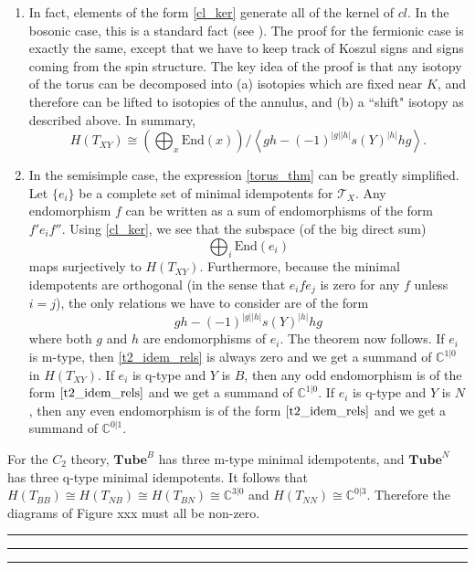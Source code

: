 \documentclass[12pt,a4paper]{article}
\newcommand{\cc}{\mathbb{C}}
\newcommand{\mct}{\mathcal{T}}
\newcommand\be            {\begin{equation}}
\newcommand\ee            {\end{equation}}
\newcommand{\End}{\text{End}}
\newcommand{\tube}{\textbf{Tube}}
\newcommand{\kwsep}{\bigskip\hrule\medskip\hrule\medskip\hrule\bigskip}
\begin{document}
\begin{enumerate}
\item In fact, elements of the form \eqref{cl_ker} generate all of the kernel of $cl$.
In the bosonic case, this is a standard fact (see \cite{Walker2006}).
The proof for the fermionic case is exactly the same, except that we have to keep track of
Koszul signs and signs coming from the spin structure.
The key idea of the proof is that any isotopy of the torus can be decomposed into (a) isotopies which
are fixed near $K$, and therefore can be lifted to isotopies of the annulus, and (b) a ``shift" isotopy
as described above.
In summary,
\be \label{torus_thm}
	H(T_{XY}) \cong \left( \bigoplus_x \End(x) \right) / \left\langle gh - (-1)^{|g| |h|} s(Y)^{|h|} hg \right\rangle .
\ee

\item In the semisimple case, the expression \eqref{torus_thm} can be greatly simplified.
Let $\{e_i\}$ be a complete set of minimal idempotents for $\mct_X$.
Any endomorphism $f$ can be written as a sum of endomorphisms of the form $f' e_i f''$.
Using \eqref{cl_ker}, we see that the subspace (of the big direct sum)
\be
	\bigoplus_i \End(e_i)
\ee
maps surjectively to $H(T_{XY})$.
Furthermore, because the minimal idempotents are orthogonal (in the sense that $e_i f e_j$ is zero for any $f$ unless $i=j$),
the only relations we have to consider are of the form
\be \label{t2_idem_rels}
	gh - (-1)^{|g| |h|} s(Y)^{|h|} hg
\ee
where both $g$ and $h$ are endomorphisms of $e_i$.
The theorem now follows.
If $e_i$ is m-type, then \eqref{t2_idem_rels} is always zero and we get a summand of $\cc^{1|0}$ in $H(T_{XY})$.
If $e_i$ is q-type and $Y$ is $B$, then any odd endomorphism is of the form $\eqref{t2_idem_rels}$
and we get a summand of $\cc^{1|0}$.
If $e_i$ is q-type and $Y$ is $N$, then any even endomorphism is of the form $\eqref{t2_idem_rels}$
and we get a summand of $\cc^{0|1}$.

\end{enumerate}

For the $C_2$ theory, $\tube^B$ has three m-type minimal idempotents, and $\tube^N$ has three q-type minimal idempotents.
It follows that $H(T_{BB}) \cong H(T_{NB}) \cong H(T_{BN}) \cong \cc^{3|0}$ and
$H(T_{NN}) \cong \cc^{0|3}$.
Therefore the diagrams of Figure xxx must all be non-zero.

\kwsep
 
 


 
\end{document}
